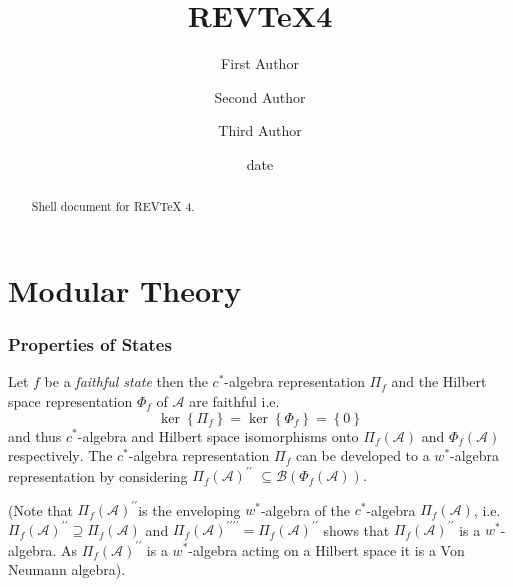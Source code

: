 \documentclass[aps,preprint]{revtex4}%
\begin{document}
\title[Short title for running header]{REV\TeX4}
\author{First Author}
\author{Second Author}
\author{Third Author}

\begin{abstract}
Shell document for REV\TeX{} 4.

\end{abstract}
\date[Date text]{date}




\maketitle
\tableofcontents


\section{Modular Theory}

\subsubsection{Properties of States}

Let $f$ be a \emph{faithful state} then the $c^{\ast}$-algebra representation
$\Pi_{f}$ and the Hilbert space representation $\Phi_{f}$ of $\mathcal{A}$ are
faithful i.e.
\begin{equation}
\ker\left\{  \Pi_{f}\right\}  =\ker\left\{  \Phi_{f}\right\}  =\left\{
0\right\}
\end{equation}
and thus $c^{\ast}$-algebra and Hilbert space isomorphisms onto $\Pi
_{f}\left(  \mathcal{A}\right)  $ and $\Phi_{f}\left(  \mathcal{A}\right)  $
respectively$.$ The $c^{\ast}$-algebra representation $\Pi_{f}$ can be
developed to a $w^{\ast}$-algebra representation by considering $\Pi
_{f}\left(  \mathcal{A}\right)  ^{\prime\prime}$ $\subseteq\mathcal{B}\left(
\Phi_{f}\left(  \mathcal{A}\right)  \right)  .$

(Note that $\Pi_{f}\left(  \mathcal{A}\right)  ^{\prime\prime}$is the
enveloping $w^{\ast}$-algebra of the $c^{\ast}$-algebra $\Pi_{f}\left(
\mathcal{A}\right)  $, i.e. $\Pi_{f}\left(  \mathcal{A}\right)  ^{\prime
\prime}\supseteq\Pi_{f}\left(  \mathcal{A}\right)  $ and $\Pi_{f}\left(
\mathcal{A}\right)  ^{\prime\prime\prime\prime}=\Pi_{f}\left(  \mathcal{A}%
\right)  ^{\prime\prime}$ shows that $\Pi_{f}\left(  \mathcal{A}\right)
^{\prime\prime}$ is a $w^{\ast}$-algebra. As $\Pi_{f}\left(  \mathcal{A}%
\right)  ^{\prime\prime}$ is a $w^{\ast}$-algebra acting on a Hilbert space it
is a Von Neumann algebra).
\end{document}
